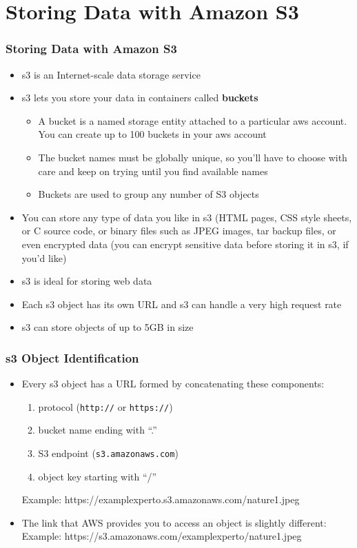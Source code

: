 \documentclass{beamer}
\begin{document}
\section{Storing Data with Amazon S3}
\begin{frame}
\frametitle{Storing Data with Amazon S3}
\begin{itemize}
 \item \acrfull{s3} is an Internet-scale data storage service
 \item \acrshort{s3} lets you store your data in containers called \textbf{buckets}
  \begin{itemize}
 \item A bucket is a named storage entity attached to a particular \acrshort{aws} account. You can create up to 100 buckets in your \acrshort{aws} account
 \item The bucket names must be globally unique, so you’ll have to choose with care and keep on trying until you find available names
 \item Buckets are used to group any number of S3 objects
\end{itemize}
 \item You can store any type of data you like in \acrshort{s3} (HTML pages, CSS style sheets, or C source code, or binary files such as JPEG images, tar
backup files, or even encrypted data (you can encrypt sensitive data before storing
it in \acrshort{s3}, if you’d like)
 \item \acrshort{s3} is ideal for storing web data
 \item Each \acrshort{s3} object has its own URL and \acrshort{s3} can handle a very high request rate
\item \acrshort{s3} can store objects of up to 5GB in size

\end{itemize}
\end{frame}

\begin{frame}[fragile]
\frametitle{\acrshort{s3} Object Identification}
\begin{itemize}
\item Every \acrshort{s3} object has a URL formed by concatenating these components:
\begin{enumerate}
\item protocol (\texttt{http://} or \texttt{https://})
\item bucket name ending with ``.''
\item S3 endpoint (\texttt{s3.amazonaws.com})
\item object key starting with ``/''
\end{enumerate}
Example: https://examplexperto.s3.amazonaws.com/nature1.jpeg
\item The link that AWS provides you to access an object is slightly different: \\
      Example: https://s3.amazonaws.com/examplexperto/nature1.jpeg
\end{itemize}

\end{frame}
\end{document}
